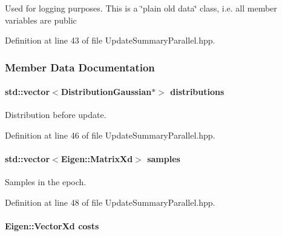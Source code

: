 Used for logging purposes. This is a \char`\"{}plain old data\char`\"{} class, i.\+e. all member variables are public 

Definition at line 43 of file Update\+Summary\+Parallel.\+hpp.



\subsubsection{Member Data Documentation}
\hypertarget{classDmpBbo_1_1UpdateSummaryParallel_a8a18736c693cebddd78ee177f1b98072}{
\paragraph[{distributions}]{\setlength{\rightskip}{0pt plus 5cm}std\+::vector$<${\bf Distribution\+Gaussian}$\ast$$>$ distributions}}\label{classDmpBbo_1_1UpdateSummaryParallel_a8a18736c693cebddd78ee177f1b98072}


Distribution before update. 



Definition at line 46 of file Update\+Summary\+Parallel.\+hpp.

\hypertarget{classDmpBbo_1_1UpdateSummaryParallel_a51b1cef263f72426eb1462891d327338}{
\paragraph[{samples}]{\setlength{\rightskip}{0pt plus 5cm}std\+::vector$<$Eigen\+::\+Matrix\+Xd$>$ samples}}\label{classDmpBbo_1_1UpdateSummaryParallel_a51b1cef263f72426eb1462891d327338}


Samples in the epoch. 



Definition at line 48 of file Update\+Summary\+Parallel.\+hpp.

\hypertarget{classDmpBbo_1_1UpdateSummaryParallel_ac3b47ca8e32f8b5cdaa23bdd375ccfd3}{
\paragraph[{costs}]{\setlength{\rightskip}{0pt plus 5cm}Eigen\+::\+Vector\+Xd costs}}\label{classDmpBbo_1_1UpdateSummaryParallel_ac3b47ca8e32f8b5cdaa23bdd375ccfd3}


